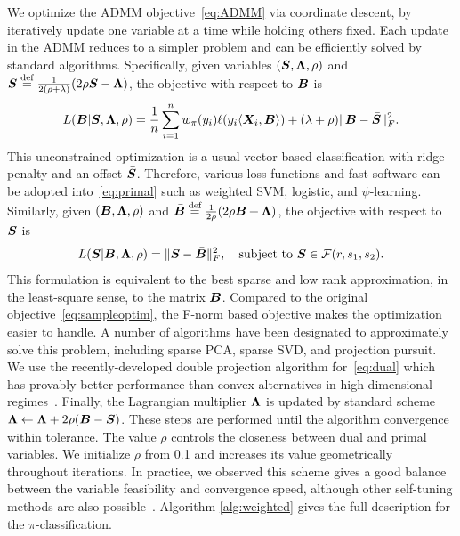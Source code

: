 \documentclass[11pt]{article}
\theoremstyle{definition}
\begin{document}
We optimize the ADMM objective~\eqref{eq:ADMM} via coordinate descent, by iteratively update one variable at a time while holding others fixed. Each update in the ADMM reduces to a simpler problem and can be efficiently solved by standard algorithms. Specifically, given variables $(\bm S,\bm{\Lambda},\rho)$ and $\bar {\bm S}\stackrel{\text{def}}{=}{1\over 2(\rho+\lambda)}(2\rho\bm S-\bm{\Lambda})$, the objective with respect to $\bm B$ is
\begin{align}\label{eq:primal}
L(\bm B|\bm S,\bm{\Lambda},\rho)={1\over n}\sum_{i=1}^n w_\pi(y_i)\ell(y_i\langle\bm X_i,\bm B\rangle)+(\lambda+\rho)\lVert\bm B-\bar {\bm S}\rVert_F^2.
\end{align}
This unconstrained optimization is a usual vector-based classification with ridge penalty and an offset $\bar {\bm S}$. Therefore, various loss functions and fast software can be adopted into~\eqref{eq:primal} such as weighted SVM, logistic, and $\psi$-learning. Similarly, given $(\bm B,\bm{\Lambda},\rho)$ and $\bar {\bm B}\stackrel{\text{def}}{=}{1\over 2\rho}(2\rho\bm B+\bm{\Lambda})$, the objective with respect to $\bm S$ is
\begin{equation}\label{eq:dual}
L(\bm S|\bm B,\bm{\Lambda},\rho)=\lVert\bm S-\bar {\bm B}\rVert_F^2,\quad \text{subject to }\bm S\in\mathcal{F}(r,s_1,s_2).
\end{equation}
This formulation is equivalent to the best sparse and low rank approximation, in the least-square sense, to the matrix $\bm B$. Compared to the original objective~\eqref{eq:sampleoptim}, the F-norm based objective makes the optimization easier to handle. A number of algorithms have been designated to approximately solve this problem, including sparse PCA, sparse SVD, and projection pursuit. We use the recently-developed double projection algorithm for~\eqref{eq:dual} which has provably better performance than convex alternatives in high dimensional regimes~\citep{yang2016rate}. Finally, the Lagrangian multiplier $\bm{\Lambda}$ is updated by standard scheme $\bm{\Lambda}\leftarrow\bm{\Lambda}+2\rho(\bm B-\bm S)$.  These steps are performed until the algorithm convergence within tolerance. The value $\rho$ controls the closeness between dual and primal variables. We initialize $\rho$ from 0.1 and increases its value geometrically throughout iterations. In practice, we observed this scheme gives a good balance between the variable feasibility and convergence speed, although other self-tuning methods are also possible~\citep{parikh2014proximal}. Algorithm \ref{alg:weighted} gives the full description for the $\pi$-classification. 
\end{document}
